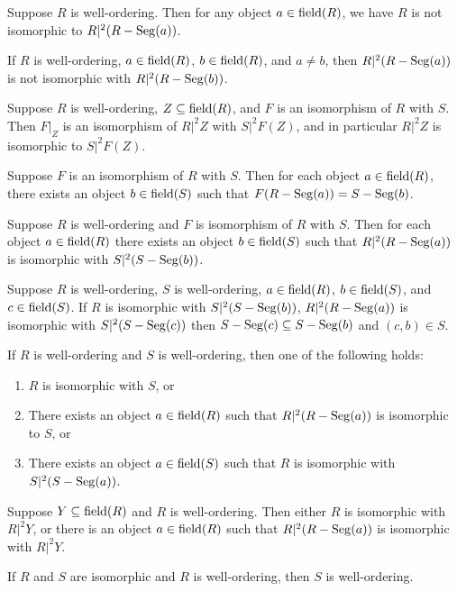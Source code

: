 \documentclass{article}
\begin{document}
\begin{thm}
\item\label{wellord1:46} Suppose $R$ is well-ordering.
  Then for any object $a\in\operatorname{field}(R)$, we have $R$ is not isomorphic to $R|^{2}(R-\operatorname{Seg}(a))$.
\item\label{wellord1:47} If $R$ is well-ordering, $a\in\operatorname{field}(R)$,
  $b\in\operatorname{field}(R)$, and $a\neq b$, then $R|^{2}(R-\operatorname{Seg}(a))$ is not
  isomorphic with $R|^{2}(R-\operatorname{Seg}(b))$.
\item\label{wellord1:48} Suppose $R$ is well-ordering,
  $Z\subseteq\operatorname{field}(R)$, and $F$ is an isomorphism of $R$ with $S$.
  Then $F|_{Z}$ is an isomorphism of $R|^{2}Z$ with $S|^{2}F(Z)$, and in
  particular $R|^{2}Z$ is isomorphic to $S|^{2}F(Z)$.
\item\label{wellord1:49} Suppose $F$ is an isomorphism of $R$ with $S$.
  Then for each object $a\in\operatorname{field}(R)$, there exists an object
  $b\in\operatorname{field}(S)$ such that $F(R-\operatorname{Seg}(a))=S-\operatorname{Seg}(b)$.
\item\label{wellord1:50} Suppose $R$ is well-ordering and $F$ is
  isomorphism of $R$ with $S$.
  Then for each object $a\in\operatorname{field}(R)$ there exists an object $b\in\operatorname{field}(S)$
  such that $R |^{2} (R-\operatorname{Seg}(a))$ is isomorphic with $S |^2 (S-\operatorname{Seg}(b))$.
\item\label{wellord1:51} Suppose $R$ is well-ordering,
  $S$ is well-ordering, $a\in\operatorname{field}(R)$, $b\in\operatorname{field}(S)$, and
  $c\in\operatorname{field}(S)$.
  If $R$ is isomorphic with $S |^{2} (S-\operatorname{Seg}(b))$,
  $R |^{2} (R-\operatorname{Seg}(a))$ is isomorphic with $S|^{2} (S-\operatorname{Seg}(c))$
  then $S-\operatorname{Seg}(c) \subseteq S-\operatorname{Seg}(b)$ and $(c,b)\in S$.
\item\label{wellord1:52} If $R$ is well-ordering and $S$ is
  well-ordering, then one of the following holds:
  \begin{enumerate}[label=(\roman*)]
  \item $R$ is isomorphic with $S$, or
  \item There exists an object $a\in\operatorname{field}(R)$ such that $R |^{2} (R-\operatorname{Seg}(a))$
    is isomorphic to $S$, or
  \item There exists an object $a\in\operatorname{field}(S)$ such that $R$ is
    isomorphic with $S |^{2} (S-\operatorname{Seg}(a))$.
  \end{enumerate}
\item\label{wellord1:53} Suppose $Y\subseteq\operatorname{field}(R)$ and $R$ is
  well-ordering.
  Then either $R$ is isomorphic with $R |^{2} Y$, or
  there is an object $a\in\operatorname{field}(R)$ such that
  $R |^{2} (R-\operatorname{Seg}(a))$ is isomorphic with $R |^{2} Y$.
\item\label{wellord1:54} If $R$ and $S$ are isomorphic and $R$ is well-ordering, then
  $S$ is well-ordering.
\end{thm}
\end{document}
